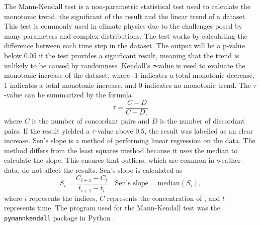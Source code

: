 The Mann-Kendall test is a non-parametric statistical test used to calculate the monotonic trend, the significant of the result and the linear trend of a dataset. This test is commonly used in climate physics due to the challenges posed by many parameters and complex distributions. The test works by calculating the difference between each time step in the dataset. The output will be a p-value below 0.05 if the test provides a significant result, meaning that the trend is unlikely to be caused by randomness. Kendall's $\tau$-value is used to evaluate the monotonic increase of the dataset, where -1 indicates a total monotonic decrease, 1 indicates a total monotonic increase, and 0 indicates no monotonic trend. The $\tau$-value can be summarized by the formula 
\begin{equation}
    \tau = \frac{C - D}{C + D,}
    \label{eq:Kendalltau}
\end{equation}
where $C$ is the number of concordant pairs and $D$ is the number of discordant pairs. If the result yielded a $\tau$-value above 0.5, the result was labelled as an clear increase. Sen's slope is a method of performing linear regression on the data. The method differs from the least squares method because it uses the median to calculate the slope. This ensures that outliers, which are common in weather data, do not affect the results. Sen's slope is calculated as 
\begin{equation}
    S_{i} = \frac{C_{i+1} - C_i}{t_{i+1} - t_i} \quad \text{Sen's slope} = \text{median}(S_{i}),
    \label{eq:Senslope}
\end{equation}
where $i$ represents the indices, $C$ represents the concentration of \PM, and $t$ represents time. The program used for the Mann-Kendall test was the \texttt{pymannkendall} package in Python \cite{hussainmd.PyMannKendallPythonPackage2019}.
